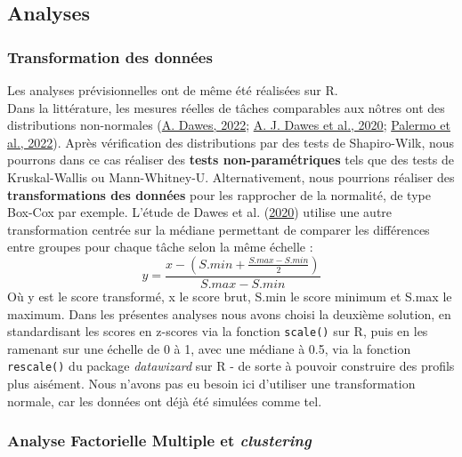 \documentclass[
  12pt,
]{article}
\begin{document}
\hypertarget{analyses}{%
\subsection{Analyses}\label{analyses}}

\hypertarget{transformation-des-donnuxe9es}{%
\subsubsection{Transformation des
données}\label{transformation-des-donnuxe9es}}

Les analyses prévisionnelles ont de même été réalisées sur R.\\
Dans la littérature, les mesures réelles de tâches comparables aux
nôtres ont des distributions non-normales
(\protect\hyperlink{ref-dawesInnerVisionsMind2022}{A. Dawes, 2022};
\protect\hyperlink{ref-dawesCognitiveProfileMultisensory2020}{A. J.
Dawes et al., 2020};
\protect\hyperlink{ref-palermoCongenitalLackExtraordinary2022}{Palermo
et al., 2022}). Après vérification des distributions par des tests de
Shapiro-Wilk, nous pourrons dans ce cas réaliser des \textbf{tests
non-paramétriques} tels que des tests de Kruskal-Wallis ou
Mann-Whitney-U. Alternativement, nous pourrions réaliser des
\textbf{transformations des données} pour les rapprocher de la
normalité, de type Box-Cox par exemple. L'étude de Dawes et al.
(\protect\hyperlink{ref-dawesCognitiveProfileMultisensory2020}{2020})
utilise une autre transformation centrée sur la médiane permettant de
comparer les différences entre groupes pour chaque tâche selon la même
échelle : \[
y = \frac{x - (S.min + \frac{S.max -S.min}{2})}{S.max-S.min}
\] Où y est le score transformé, x le score brut, S.min le score minimum
et S.max le maximum. Dans les présentes analyses nous avons choisi la
deuxième solution, en standardisant les scores en z-scores via la
fonction \texttt{scale()} sur R, puis en les ramenant sur une échelle de
0 à 1, avec une médiane à 0.5, via la fonction \texttt{rescale()} du
package \emph{datawizard} sur R - de sorte à pouvoir construire des
profils plus aisément. Nous n'avons pas eu besoin ici d'utiliser une
transformation normale, car les données ont déjà été simulées comme tel.

\hypertarget{analyse-factorielle-multiple-et-clustering}{%
\subsubsection{\texorpdfstring{Analyse Factorielle Multiple et
\emph{clustering}}{Analyse Factorielle Multiple et clustering}}\label{analyse-factorielle-multiple-et-clustering}}
\end{document}

